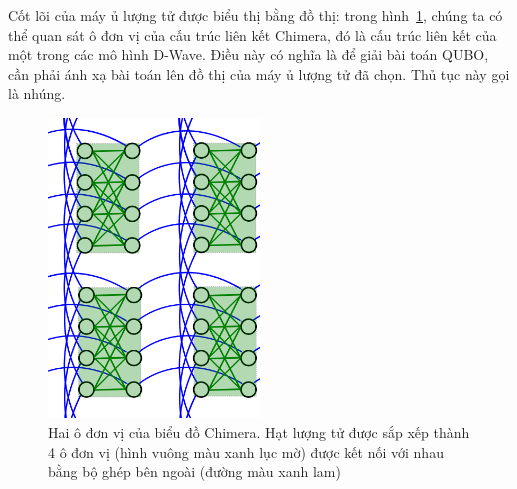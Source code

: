 Cốt lõi của máy ủ lượng tử được biểu thị bằng đồ thị: trong hình~\ref{fig: Pegasus_qubits}, chúng ta có thể quan sát ô đơn vị của cấu trúc liên kết Chimera, đó là cấu trúc liên kết của một trong các mô hình D-Wave.
Điều này có nghĩa là để giải bài toán QUBO, cần phải ánh xạ bài toán lên đồ thị của máy ủ lượng tử đã chọn. Thủ tục này gọi là nhúng.

\begin{figure}[H]
    \centering
    \includegraphics[width=0.5\textwidth]{images/Chimera_2x2_unit_cells.png}
    \caption{Hai ô đơn vị của biểu đồ Chimera. Hạt lượng tử được sắp xếp thành 4 ô đơn vị (hình vuông màu xanh lục mờ) được kết nối với nhau bằng bộ ghép bên ngoài (đường màu xanh lam) \cite{Topologies}}
    \label{fig: Pegasus_qubits}
\end{figure}




